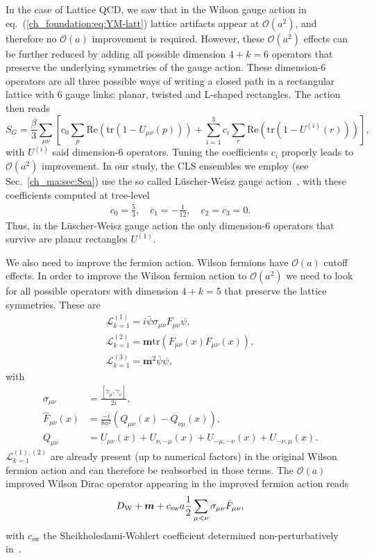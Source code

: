 In the case of Lattice QCD, we saw that in the Wilson gauge action in eq.~(\ref{ch_foundation:eq:YM-latt}) lattice artifacts appear at $\mathcal{O}(a^2)$, and therefore no $\mathcal{O}(a)$ improvement is required. However, these $\mathcal{O}(a^2)$ effects can be further reduced by adding all possible dimension $4+k=6$ operators that preserve the underlying symmetries of the gauge action. These dimension-6 operators are all three possible ways of writing a closed path in a rectangular lattice with 6 gauge links: planar, twisted and L-shaped rectangles. The action then reads
\begin{equation}
\label{ch_foundation:eq:SG_impr}
S_G=\frac{\beta}{3}\sum_{\mu\nu}\left[c_0\sum_p{\textrm{Re}}\left({\textrm{tr}}\left(1-U_{\mu\nu}(p)\right)\right)+\sum_{i=1}^3c_i\sum_r{\textrm{Re}}\left({\textrm{tr}}\left(1-U^{(i)}(r)\right)\right)\right],
\end{equation}
with $U^{(i)}$ said dimension-6 operators. Tuning the coefficients $c_i$ properly leads to $\mathcal{O}(a^2)$ improvement. In our study, the CLS ensembles we employ (see Sec.~\ref{ch_ma:sec:Sea}) use the so called Lüscher-Weisz gauge action~\cite{}, with these coefficients computed at tree-level
\begin{gather}
\label{ch_foundation:eq:LW}
c_0=\frac{5}{3}, \quad
c_1=-\frac{1}{12}, \quad
c_2=c_3=0.
\end{gather}
Thus, in the Lüscher-Weisz gauge action the only dimension-6 operators that survive are planar rectangles $U^{(1)}$.

We also need to improve the fermion action. Wilson fermions have $\mathcal{O}(a)$ cutoff effects. In order to improve the Wilson fermion action to $\mathcal{O}(a^2)$ we need to look for all possible operators with dimension $4+k=5$ that preserve the lattice symmetries. These are
\begin{gather}
\mathcal{L}_{k=1}^{(1)}=i\bar{\psi}\sigma_{\mu\nu}F_{\mu\nu}\psi,\\
\mathcal{L}_{k=1}^{(2)}=\boldsymbol{m}{\textrm{tr}}\left(F_{\mu\nu}(x)F_{\mu\nu}(x)\right),\\
\mathcal{L}_{k=1}^{(3)}=\boldsymbol{m}^2\bar{\psi}\psi,
\end{gather}
with
\begin{align}
\label{ch_foundation:eq:dim5-op}
\sigma_{\mu\nu}&=\frac{\left[\gamma_{\mu},\gamma_{\nu}\right]}{2i},\\
\hat{F}_{\mu\nu}(x)&=\frac{-i}{8a^2}\left(Q_{\mu\nu}(x)-Q_{\nu\mu}(x)\right),\\
Q_{\mu\nu}&=U_{\mu\nu}(x)+U_{\nu,-\mu}(x)+U_{-\mu,-\nu}(x)+U_{-\nu,\mu}(x).
\end{align}
$\mathcal{L}_{k=1}^{(1),(2)}$ are already present (up to numerical factors) in the original Wilson fermion action and can therefore be reabsorbed in those terms. The $\mathcal{O}(a)$ improved Wilson Dirac operator appearing in the improved fermion action reads
\begin{equation}
\label{ch_foundation:eq:DW_impr}
D_{\textrm W}+\boldsymbol{m}+c_{\textrm{sw}}a\frac{1}{2}\sum_{\mu<\nu}\sigma_{\mu\nu}\hat{F}_{\mu\nu},
\end{equation}
with $c_{\textrm{sw}}$ the Sheikholeslami-Wohlert coefficient determined non-perturbatively in~\cite{}.

